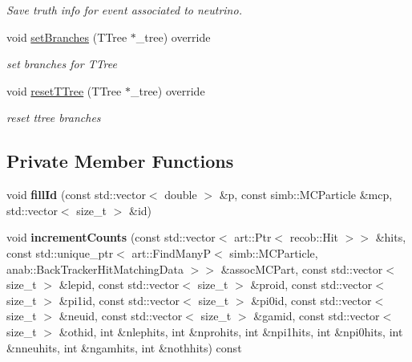 \begin{DoxyCompactItemize}
\begin{DoxyCompactList}\small\item\em Save truth info for event associated to neutrino. \end{DoxyCompactList}\item 
void \hyperlink{classanalysis_1_1SlicePurCompl_ae7e1131785f819a530a573c6b20d1cbc}{set\+Branches} (T\+Tree $\ast$\+\_\+tree) override\hypertarget{classanalysis_1_1SlicePurCompl_ae7e1131785f819a530a573c6b20d1cbc}{}\label{classanalysis_1_1SlicePurCompl_ae7e1131785f819a530a573c6b20d1cbc}

\begin{DoxyCompactList}\small\item\em set branches for T\+Tree \end{DoxyCompactList}\item 
void \hyperlink{classanalysis_1_1SlicePurCompl_a43bf5b44e619f2dc3e5d00098048471b}{reset\+T\+Tree} (T\+Tree $\ast$\+\_\+tree) override\hypertarget{classanalysis_1_1SlicePurCompl_a43bf5b44e619f2dc3e5d00098048471b}{}\label{classanalysis_1_1SlicePurCompl_a43bf5b44e619f2dc3e5d00098048471b}

\begin{DoxyCompactList}\small\item\em reset ttree branches \end{DoxyCompactList}\end{DoxyCompactItemize}
\subsection*{Private Member Functions}
\begin{DoxyCompactItemize}
\item 
void {\bfseries fill\+Id} (const std\+::vector$<$ double $>$ \&p, const simb\+::\+M\+C\+Particle \&mcp, std\+::vector$<$ size\+\_\+t $>$ \&id)\hypertarget{classanalysis_1_1SlicePurCompl_a1cab4a3ebdd3aae05b22ad5d06a6ce1b}{}\label{classanalysis_1_1SlicePurCompl_a1cab4a3ebdd3aae05b22ad5d06a6ce1b}

\item 
void {\bfseries increment\+Counts} (const std\+::vector$<$ art\+::\+Ptr$<$ recob\+::\+Hit $>$$>$ \&hits, const std\+::unique\+\_\+ptr$<$ art\+::\+Find\+ManyP$<$ simb\+::\+M\+C\+Particle, anab\+::\+Back\+Tracker\+Hit\+Matching\+Data $>$$>$ \&assoc\+M\+C\+Part, const std\+::vector$<$ size\+\_\+t $>$ \&lepid, const std\+::vector$<$ size\+\_\+t $>$ \&proid, const std\+::vector$<$ size\+\_\+t $>$ \&pi1id, const std\+::vector$<$ size\+\_\+t $>$ \&pi0id, const std\+::vector$<$ size\+\_\+t $>$ \&neuid, const std\+::vector$<$ size\+\_\+t $>$ \&gamid, const std\+::vector$<$ size\+\_\+t $>$ \&othid, int \&nlephits, int \&nprohits, int \&npi1hits, int \&npi0hits, int \&nneuhits, int \&ngamhits, int \&nothhits) const \hypertarget{classanalysis_1_1SlicePurCompl_a9082598390de196a54bb9ba4ce4b02b4}{}\label{classanalysis_1_1SlicePurCompl_a9082598390de196a54bb9ba4ce4b02b4}

\end{DoxyCompactItemize}
